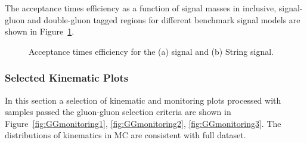 \FloatBarrier

The acceptance times efficiency as a function of signal masses in inclusive, signal-gluon and double-gluon
tagged regions for different benchmark signal models are shown in Figure~\ref{fig:AccxEff}.

\begin{figure}[htb]
 \centering
 \caption{Acceptance times efficiency for the (a) \Hprime signal and (b) String signal.}
 \label{fig:AccxEff}
\end{figure}
\FloatBarrier
\subsubsection{Selected Kinematic Plots}

In this section a selection of kinematic and monitoring plots processed with samples passed the gluon-gluon selection criteria are shown in Figure~\ref{fig:GGmonitoring1}, \ref{fig:GGmonitoring2}, \ref{fig:GGmonitoring3}. The distributions of kinematics in MC are consistent with full dataset.

